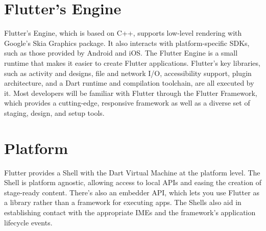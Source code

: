 \section{Flutter's Engine}
Flutter's Engine, which is based on C++, supports low-level rendering with Google's Skia Graphics package. It also interacts with platform-specific SDKs, such as those provided by Android and iOS.
The Flutter Engine is a small runtime that makes it easier to create Flutter applications. Flutter's key libraries, such as activity and designs, file and network I/O, accessibility support, plugin architecture, and a Dart runtime and compilation toolchain, are all executed by it. Most developers will be familiar with Flutter through the Flutter Framework, which provides a cutting-edge, responsive framework as well as a diverse set of staging, design, and setup tools.



\section{Platform}
Flutter provides a Shell with the Dart Virtual Machine at the platform level. The Shell is platform agnostic, allowing access to local APIs and easing the creation of stage-ready content. There's also an embedder API, which lets you use Flutter as a library rather than a framework for executing apps. The Shells also aid in establishing contact with the appropriate IMEs and the framework's application lifecycle events.